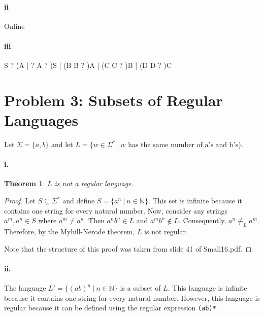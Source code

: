 \documentclass[10pt,letter]{article}
\newtheorem*{thm}{Theorem}
\begin{document}
\paragraph{ii}
Online

\paragraph{iii}
S ? (A | ?
A ? )S | (B
B ? )A | (C
C ? )B | (D
D ? )C

\section*{Problem 3: Subsets of Regular Languages}
Let $\Sigma = \{a, b\}$ and let $L = \{ w \in \Sigma^* \ | \ w \text{ has the same number of a's and b's} \}$. 
\paragraph{i.} 
\begin{thm} $L$ is not a regular language. \end{thm}

\begin{proof}
Let $S \subseteq \Sigma^*$ and define $S = \{a^n \ | \ n \in \mathbb{N} \}$. This set is infinite because it contains one string for every natural number. Now, consider any strings $a^m, a^n \in S$ where $a^m \not = a^n$. Then $a^n b^n \in L$ and $a^m b^n \not \in L$. Consequently, $a^n \not \equiv_L a^m$. Therefore, by the Myhill-Nerode theorem, $L$ is not regular.

Note that the structure of this proof was taken from slide 41 of Small16.pdf.
\end{proof}

\paragraph{ii.}
The language $L' = \{ (ab)^n \ | \ n \in \mathbb{N} \}$ is a subset of $L$. This language is infinite because it contains one string for every natural number. However, this language is regular because it can be defined using the regular expression \texttt{(ab)*}. 
\end{document}
